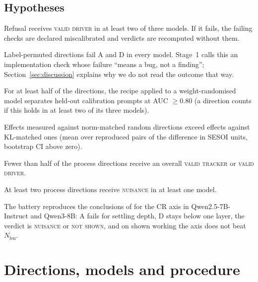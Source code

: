 \documentclass[11pt]{article}
\newcommand{\verdict}[1]{\textsc{\MakeLowercase{#1}}}
\begin{document}
\subsection{Hypotheses}
\begin{description}[leftmargin=1.2em,style=nextline]
\item[H1 (positive control).] Refusal receives \verdict{VALID DRIVER} in at least two of three models. If it fails, the failing checks are declared miscalibrated and verdicts are recomputed without them.
\item[H2 (negative control).] Label-permuted directions fail A and D in every model. Stage~1 calls this an implementation check whose failure ``means a bug, not a finding''; Section~\ref{sec:discussion} explains why we do not read the outcome that way.
\item[H3 (Adebayo analogue).] For at least half of the directions, the recipe applied to a weight-randomised model separates held-out calibration prompts at AUC $\ge 0.80$ (a direction counts if this holds in at least two of its three models).
\item[H4.] Effects measured against norm-matched random directions exceed effects against KL-matched ones (mean over reproduced pairs of the difference in SESOI units, bootstrap CI above zero).
\item[H5.] Fewer than half of the process directions receive an overall \verdict{VALID TRACKER} or \verdict{VALID DRIVER}.
\item[H6.] At least two process directions receive \verdict{NUISANCE} in at least one model.
\item[H7 (retrodiction).] The battery reproduces the conclusions of \citet{ramdan2026crv2} for the CR axis in Qwen2.5-7B-Instruct and Qwen3-8B: A fails for settling depth, D stays below one layer, the verdict is \verdict{NUISANCE} or \verdict{NOT SHOWN}, and on shown working the axis does not beat $N_\text{len}$.
\end{description}

\section{Directions, models and procedure}\label{sec:directions}
\end{document}
